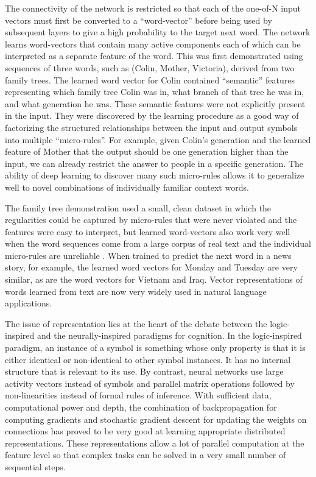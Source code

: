 \documentclass[]{article}
\begin{document}
The connectivity of the network is restricted so that each of the one-of-N
input vectors must first be converted to a ``word-vector'' before being
used by subsequent layers to give a high probability to the target next
word.  The network learns word-vectors that contain many active components
each of which can be interpreted as a separate feature of the word. This
was first demonstrated\cite{RHW} using sequences of three words, such as
(Colin, Mother, Victoria), derived from two family trees. The learned word
vector for Colin contained ``semantic'' features representing which family
tree Colin was in, what branch of that tree he was in, and what generation
he was\cite{hinton86}. These semantic features were not explicitly present
in the input.  They were discovered by the learning procedure as a good way
of factorizing the structured relationships between the input and output
symbols into multiple ``micro-rules''.  For example, given Colin's
generation and the learned feature of Mother that the output should be one
generation higher than the input, we can already restrict the answer to
people in a specific generation. The ability of deep learning to discover
many such micro-rules allows it to generalize well to novel combinations of
individually familiar context words.

The family tree demonstration used a small, clean dataset in which the
regularities could be captured by micro-rules that were never violated and
the features were easy to interpret, but learned word-vectors also work
very well when the word sequences come from a large corpus of real text and
the individual micro-rules are unreliable\cite{NPLM} . When trained to
predict the next word in a news story, for example, the learned word
vectors for Monday and Tuesday are very similar, as are the word vectors
for Vietnam and Iraq.  Vector representations of words learned from text
are now very widely used in natural language applications\cite{Collobert,
  Mikolov, Socher?}.

The issue of representation lies at the heart of the debate between the
logic-inspired and the neurally-inspired paradigms for cognition. In the
logic-inspired paradigm, an instance of a symbol is something whose only
property is that it is either identical or non-identical to other symbol
instances. It has no internal structure that is relevant to its use. By
contrast, neural networks use large activity vectors instead of symbols and
parallel matrix operations followed by non-linearities instead of formal
rules of inference. With sufficient data, computational power and depth,
the combination of backpropagation for computing gradients and stochastic
gradient descent for updating the weights on connections has proved to be
very good at learning appropriate distributed representations. These
representations allow a lot of parallel computation at the feature level so
that complex tasks can be solved in a very small number of sequential
steps.
\end{document}
